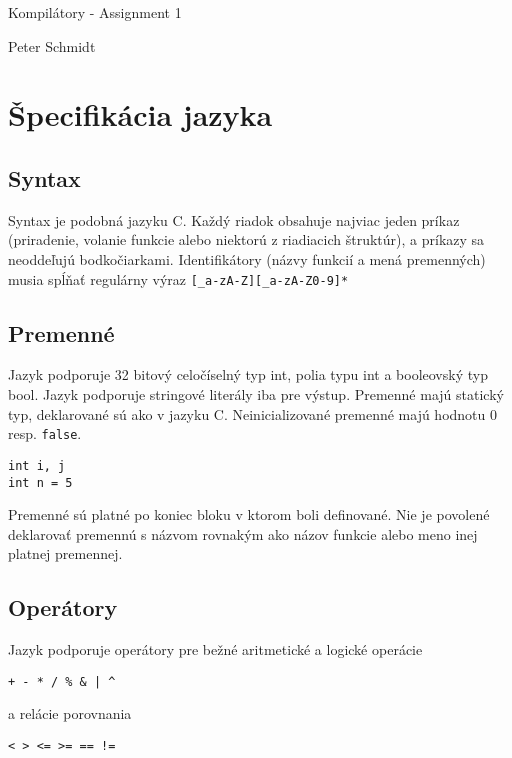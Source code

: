 \documentclass{article}
\begin{document}


\lstset{escapechar=@,style=customc}


\centerline{\sc \large Kompilátory - Assignment 1}
\vspace{.5pc}
\centerline{\sc Peter Schmidt}
\vspace{2pc}

\section{Špecifikácia jazyka}
 
    \subsection{Syntax}
        Syntax je podobná jazyku C.
        Každý riadok obsahuje najviac jeden príkaz (priradenie, volanie funkcie alebo niektorú z riadiacich štruktúr),
        a príkazy sa neoddeľujú bodkočiarkami.
        Identifikátory (názvy funkcií a mená premenných) musia spĺňať regulárny výraz \texttt{[\_a-zA-Z][\_a-zA-Z0-9]*}

    \subsection{Premenné}
        Jazyk podporuje 32 bitový celočíselný typ int, polia typu int a booleovský typ bool.
        Jazyk podporuje stringové literály iba pre výstup.
        Premenné majú statický typ, deklarované sú ako v jazyku C.
        Neinicializované premenné majú hodnotu 0 resp. \texttt{false}.
        \begin{lstlisting}
int i, j
int n = 5
        \end{lstlisting}
        Premenné sú platné po koniec bloku v ktorom boli definované.
        Nie je povolené deklarovať premennú s názvom rovnakým ako názov funkcie alebo meno inej platnej premennej.

    \subsection{Operátory}
        Jazyk podporuje operátory pre bežné aritmetické a logické operácie
        \begin{lstlisting}
+ - * / % & | ^
        \end{lstlisting}
        a relácie porovnania
        \begin{lstlisting}
< > <= >= == !=
        \end{lstlisting}
\end{document}
